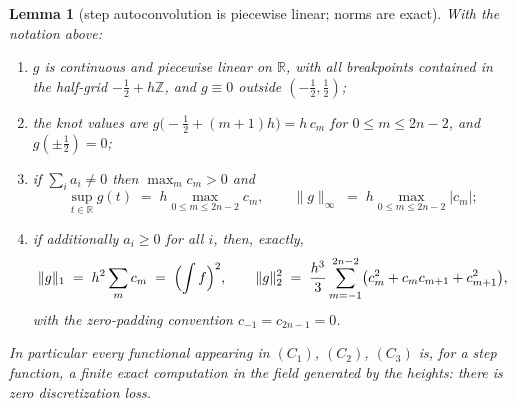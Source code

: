 \documentclass[11pt]{article}
\newtheorem{lemma}[theorem]{Lemma}
\theoremstyle{remark}
\newcommand{\RR}{\mathbb{R}}
\newcommand{\ZZ}{\mathbb{Z}}
\newcommand{\supnorm}[1]{\lVert #1 \rVert_\infty}
\newcommand{\onenorm}[1]{\lVert #1 \rVert_1}
\newcommand{\twonorm}[1]{\lVert #1 \rVert_2}
\begin{document}
\begin{lemma}[step autoconvolution is piecewise linear; norms are exact]
\label{lem:pwlinear}
With the notation above:
\begin{enumerate}
\item[(i)] $g$ is continuous and piecewise linear on $\RR$, with all
breakpoints contained in the half-grid $-\tfrac12 + h\ZZ$, and $g \equiv 0$
outside $(-\tfrac12, \tfrac12)$;
\item[(ii)] the knot values are $g\bigl(-\tfrac12 + (m+1)h\bigr) = h\,c_m$
for $0 \le m \le 2n-2$, and $g(\pm\tfrac12) = 0$;
\item[(iii)] if $\sum_i a_i \neq 0$ then $\max_m c_m > 0$ and
\[
\sup_{t \in \RR} g(t) \;=\; h \max_{0 \le m \le 2n-2} c_m ,
\qquad
\supnorm{g} \;=\; h \max_{0 \le m \le 2n-2} |c_m| ;
\]
\item[(iv)] if additionally $a_i \ge 0$ for all $i$, then, exactly,
\[
\onenorm{g} \;=\; h^2 \sum_m c_m \;=\; \Bigl(\int f\Bigr)^2 ,
\qquad
\twonorm{g}^2 \;=\; \frac{h^3}{3} \sum_{m=-1}^{2n-2}
\bigl(c_m^2 + c_m c_{m+1} + c_{m+1}^2\bigr),
\]
with the zero-padding convention $c_{-1} = c_{2n-1} = 0$.
\end{enumerate}
In particular every functional appearing in $(C_1)$, $(C_2)$, $(C_3)$ is,
for a step function, a finite exact computation in the field generated by
the heights: there is zero discretization loss.
\end{lemma}
\end{document}
